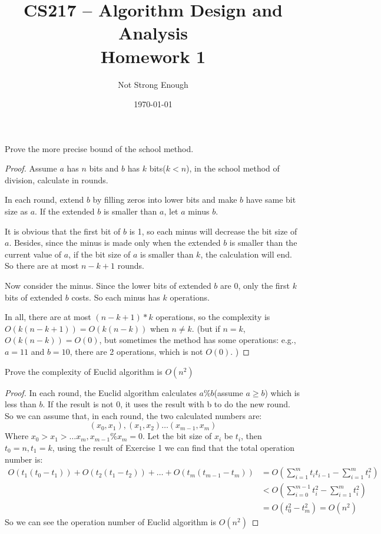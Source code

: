 \documentclass[UTF8, a4paper, linespread=1.5]{article}
\title{CS217 -- Algorithm Design and Analysis \\ Homework 1}
\date{\today}
\author{Not Strong Enough}
\begin{document}
\maketitle

\begin{thm}{}{}
    Prove the more precise bound of the school method.
\end{thm}
\begin{proof}
	Assume $a$ has $n$ bits and $b$ has $k$ bits($k < n$), in the school method of division, 
	calculate in rounds. 
	
	In each round, extend $b$ by filling zeros into lower bits and make $b$ have same bit size as $a$. 
	If the extended $b$ is smaller than $a$, let $a$ minus $b$. 
	
	It is obvious that the first bit of $b$ is 1, so each minus will decrease the bit size of $a$. 
	Besides, since the minus is made only when the extended $b$ is smaller than the current value of $a$, 
	if the bit size of $a$ is smaller than $k$, the calculation will end. 
	So there are at most $n-k+1$ rounds. 
	
	Now consider the minus. Since the lower bits of extended $b$ are 0, only the first $k$ bits of extended $b$ 
	costs. So each minus has $k$ operations. 
	
    In all, there are at most $(n-k+1)*k$ operations, so the complexity is $O(k(n-k+1))=O(k(n-k))$ when $n\neq k$. 
    (but if $n=k$, $O(k(n-k))=O(0)$, but sometimes the method has some operations: e.g., $a=11$ and $b=10$, 
    there are 2 operations, which is not $O(0)$. )
\end{proof}

\newpage
\begin{thm}{}{}
    Prove the complexity of Euclid algorithm is $O(n^2)$
\end{thm}
\begin{proof}
	In each round, the Euclid algorithm calculates $a\%b$(assume $a\geq b$) which is less than $b$. 
	If the result is not 0, it uses the result with b to do the new round. So we can assume that, in each round, 
	the two calculated numbers are: 
	$$(x_0, x_1), (x_1, x_2)\dots (x_{m-1}, x_m)$$
	Where $x_0>x_1>\dots x_m, x_{m-1}\%x_m=0$. 
	Let the bit size of $x_i$ be $t_i$, then $t_0=n, t_1=k$, 
	using the result of Exercise 1 we can find that the total operation number is: 
    \begin{align}
    O(t_1(t_0-t_1))+O(t_2(t_1-t_2))+\dots + O(t_m(t_{m-1}-t_m)) &=O(\sum_{i=1}^m t_i t_{i-1}-\sum_{i=1}^m t_i^2)\\
    &<O(\sum_{i=0}^{m-1} t_i^2 -\sum_{i=1}^m t_i^2)\\
    &=O(t_0^2-t_m^2)=O(n^2)
    \end{align}
	So we can see the operation number of Euclid algorithm is $O(n^2)$
\end{proof}
\end{document}
